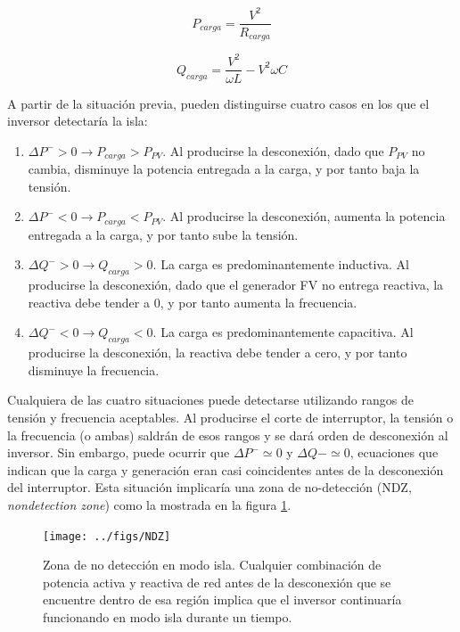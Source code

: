\begin{equation}
P_{carga}=\frac{V^{2}}{R_{carga}}\end{equation}


\begin{equation}
Q_{carga}=\frac{V^{2}}{\omega L}-V^{2}\omega C\end{equation}


A partir de la situación previa, pueden distinguirse cuatro casos
en los que el inversor detectaría la isla: 
\begin{enumerate}
\item $\Delta P^{-}>0\rightarrow P_{carga}>P_{PV}$. Al producirse la desconexión,
dado que $P_{PV}$ no cambia, disminuye la potencia entregada a la
carga, y por tanto baja la tensión.
\item $\Delta P^{-}<0\rightarrow P_{carga}<P_{PV}$. Al producirse la desconexión,
aumenta la potencia entregada a la carga, y por tanto sube la tensión.
\item $\Delta Q^{-}>0\rightarrow Q_{carga}>0$. La carga es predominantemente
inductiva. Al producirse la desconexión, dado que el generador FV
no entrega reactiva, la reactiva debe tender a 0, y por tanto aumenta
la frecuencia.
\item $\Delta Q^{-}<0\rightarrow Q_{carga}<0$. La carga es predominantemente
capacitiva. Al producirse la desconexión, la reactiva debe tender
a cero, y por tanto disminuye la frecuencia.
\end{enumerate}
Cualquiera de las cuatro situaciones puede detectarse utilizando rangos
de tensión y frecuencia aceptables. Al producirse el corte de interruptor,
la tensión o la frecuencia (o ambas) saldrán de esos rangos y se dará
orden de desconexión al inversor.
Sin embargo, puede ocurrir que $\Delta P^{-}\simeq0$
y $\Delta Q-\simeq0$, ecuaciones que indican que la carga y generación
eran casi coincidentes antes de la desconexión del interruptor. Esta
situación implicaría una zona de no-detección (NDZ, \emph{nondetection
zone}) como la mostrada en la figura \ref{fig:NDZ}. 

%
\begin{figure}


\texttt{[image: ../figs/NDZ]}

\caption[Zona de no detección en modo isla.]{Zona de no detección en modo isla. Cualquier combinación de potencia
activa y reactiva de red antes de la desconexión que se encuentre
dentro de esa región implica que el inversor continuaría funcionando
en modo isla durante un tiempo. \label{fig:NDZ}}



\end{figure}


